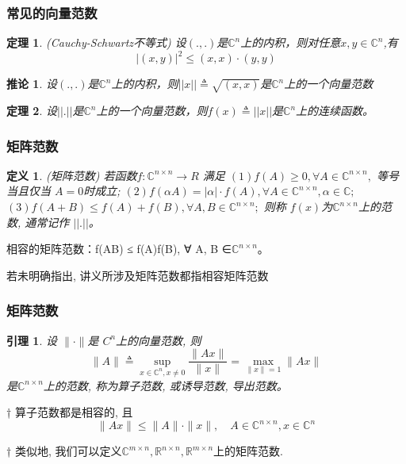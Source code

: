 \documentclass[notheorems,serif]{beamer}
\newcommand{\hei}[1]{{\HEI#1}}
\newtheorem{theorem}{\hei{定理}}
\newtheorem{definition}{\hei{定义}}
\newtheorem{lemma}{\hei{引理}}
\newtheorem{corollary}{\hei{推论}}
\begin{document}
\begin{frame}
\frametitle{常见的向量范数}
\begin{theorem}(Cauchy-Schwartz不等式)
	设$(.,.)$是$\mathbb{C}^{n}$上的内积，则对任意$x,y \in \mathbb{C}^{n}$,有
	$$
	|(x, y)|^{2} \leq(x, x) \cdot(y, y)
	$$
\end{theorem}

\begin{corollary}
	设$(.,.)$是$\mathbb{C}^{n}$上的内积，则$||x||\triangleq \sqrt{(x,x)}$是$\mathbb{C}^{n}$上的一个向量范数
\end{corollary}

\begin{theorem}
	设$||.||$是$\mathbb{C}^{n}$上的一个向量范数，则$f(x)\triangleq||x||$是$\mathbb{C}^{n}$上的连续函数。
\end{theorem}
\end{frame}

\begin{frame}
\frametitle{矩阵范数}
\begin{definition}(矩阵范数)
	若函数$f : \mathbb{C}^{n×n} → R$ 满足
	$(1) f(A) ≥ 0, ∀ A ∈ \mathbb{C}^{n×n},$ 等号当且仅当 $A = 0$时成立;
	$(2) f(αA) = |α| · f(A), ∀ A ∈ \mathbb{C}^{n×n}, α ∈ \mathbb{C};$
	$(3) f(A + B) ≤ f(A) + f(B), ∀A, B ∈ \mathbb{C}^{n×n};$
	则称 $f(x) $为$\mathbb{C}
	^{n×n} $上的范数, 通常记作 $||.||$。
\end{definition}

相容的矩阵范数：f(AB) ≤ f(A)f(B), ∀ A, B ∈$\mathbb{C}^{n×n}$。

若未明确指出, 讲义所涉及矩阵范数都指相容矩阵范数
\end{frame}

\begin{frame}
\frametitle{矩阵范数}
\begin{lemma}
	设 $∥ · ∥ $是 $C^{n}$上的向量范数, 则
	$$
	\|A\| \triangleq \sup _{x \in \mathbb{C}^{n}, x \neq 0} \frac{\|A x\|}{\|x\|}=\max _{\|x\|=1}\|A x\|
	$$
	是$\mathbb{C}
	^{n×n} $上的范数, 称为算子范数, 或诱导范数, 导出范数。
\end{lemma}

† 算子范数都是相容的, 且$$ \|A x\| \leq\|A\| \cdot\|x\|, \quad A \in \mathbb{C}^{n \times n}, x \in \mathbb{C}^{n}$$

† 类似地, 我们可以定义$\mathbb{C}^{m \times n}, \mathbb{R}^{n \times n}, \mathbb{R}^{m \times n}$上的矩阵范数.
\end{frame}
\end{document}
